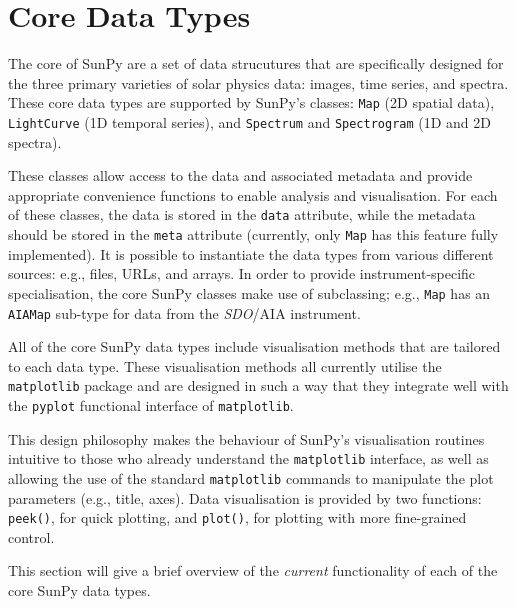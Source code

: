 \section{Core Data Types}\label{sec:DataTypes}

The core of SunPy are a set of data strucutures that are specifically designed for the
three primary varieties of solar physics data: images, time series, and
spectra. These core data types are supported by SunPy's classes:
\texttt{Map} (2D spatial data), \texttt{LightCurve} (1D temporal series),
and \texttt{Spectrum} and \texttt{Spectrogram} (1D and 2D spectra). 

These classes allow access to the data
and associated metadata and provide appropriate convenience functions to
enable analysis and visualisation. For each of these classes, the data is
stored in the \texttt{data} attribute, while the metadata should be stored 
in the \texttt{meta} attribute (currently, only \texttt{Map} has this feature 
fully implemented). 
It is possible to instantiate the
data types from various
different sources: e.g., files, URLs, and arrays.  
In order to provide instrument-specific specialisation, the core SunPy classes 
make use of subclassing; e.g., \texttt{Map} has an \texttt{AIAMap} 
sub-type for data from the \textit{SDO}/AIA instrument. 

All of the core SunPy data types 
include visualisation methods that are tailored to each data type. 
These visualisation methods all currently utilise the \texttt{matplotlib} 
package and are designed in such a way that they integrate well with 
the \texttt{pyplot} functional interface of \texttt{matplotlib}.

This design philosophy makes the behaviour of SunPy's visualisation 
routines intuitive to those who already understand the \texttt{matplotlib}
interface, as well as allowing the use of the standard 
\texttt{matplotlib} commands to manipulate the plot parameters (e.g., title, axes).
Data visualisation is provided by two functions: \texttt{peek()}, for quick 
plotting, and \texttt{plot()}, for plotting with more fine-grained control.

This section will give a brief overview of the \textit{current} functionality 
of each of the core SunPy data types.



